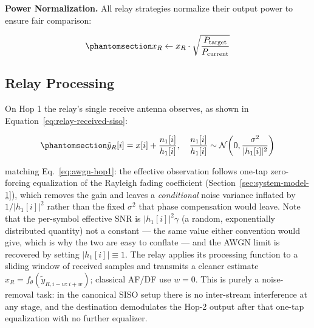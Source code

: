 \textbf{Power Normalization.} All relay strategies normalize their output power to ensure fair comparison:

\begin{equation}\protect\phantomsection\label{eq:power-normalization}{x_R \leftarrow x_R \cdot \sqrt{\frac{P_{\text{target}}}{P_{\text{current}}}}
}\end{equation}

\subsection{Relay Processing}\label{sec:relay-processing-methods}

On Hop 1 the relay's single receive antenna observes, as shown in Equation~\ref{eq:relay-received-siso}:

\begin{equation}\protect\phantomsection\label{eq:relay-received-siso}{\tilde{y}_R[i] = x[i] + \frac{n_1[i]}{h_1[i]}, \quad \frac{n_1[i]}{h_1[i]} \sim \mathcal{N}\!\left(0, \frac{\sigma^2}{|h_1[i]|^2}\right)
}\end{equation}

matching Eq.~\eqref{eq:awgn-hop1}: the effective observation follows one-tap zero-forcing equalization of the Rayleigh fading coefficient (Section~\ref{sec:system-model-1}), which removes the gain and leaves a \emph{conditional} noise variance inflated by $1/|h_1[i]|^{2}$ rather than the fixed $\sigma^{2}$ that phase compensation would leave. Note that the per-symbol effective SNR is \(|h_1[i]|^2\gamma\) (a random, exponentially distributed quantity) not a constant --- the same value either convention would give, which is why the two are easy to conflate --- and the AWGN limit is recovered by setting \(|h_1[i]| \equiv 1\). The relay applies its processing function to a sliding window of received samples and transmits a cleaner estimate \(\hat{x}_R = f_\theta(\tilde{y}_{R,i-w:i+w})\); classical AF/DF use \(w=0\). This is purely a noise-removal task: in the canonical SISO setup there is no inter-stream interference at any stage, and the destination demodulates the Hop-2 output after that one-tap equalization with no further equalizer.

